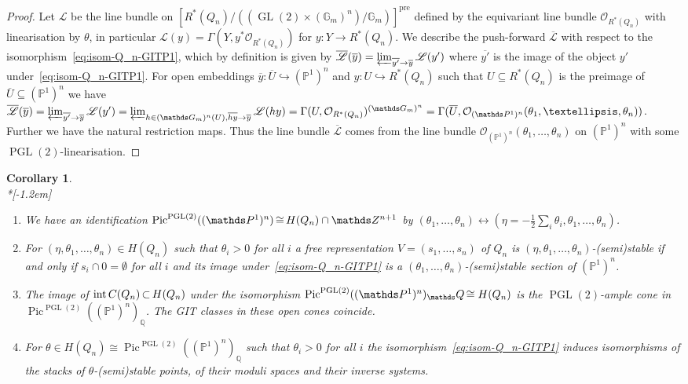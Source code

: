 \documentclass[10pt,a4paper]{amsart}
\newtheorem{coro}[theo]{Corollary}
\theoremstyle{definition}
\def\Z{\mathds Z}
\def\Q{\mathds Q}
\def\G{\mathds G}
\def\P{\mathds P}
\def\O{\mathcal O}
\DeclareMathOperator{\GL}{GL}
\DeclareMathOperator{\PGL}{PGL}
\DeclareMathOperator{\interior}{int}
\DeclareMathOperator{\Pic}{Pic}
\newcommand*{\Mk}{\mkern -2mu}
\begin{document}
\begin{proof}
Let $\mathscr L$ be the line bundle on 
$[R^*(Q_n)/((\GL(2)\times(\G_m)^n)/\G_m)]^\text{pre}$ defined by the 
equivariant line bundle $\O_{R^*(Q_n)}$ with linearisation by $\theta$, in 
particular $\mathscr L(y)=\Gamma(Y,y^*\O_{R^*(Q_n)})$ for $y\colon Y\to R^*(Q_n)$. 
We describe the push-forward $\overline{\mathscr L}$ with respect to the isomorphism~\eqref{eq:isom-Q_n-GITP1}, 
which by definition is given by 
$\overline{\mathscr L}(\overline{y})
=\varprojlim_{\overline{y'}\to\overline{y}}\mathscr L(y')$ where $\overline{y'}$ is the 
image of the object $y'$ under~\eqref{eq:isom-Q_n-GITP1}.
For open embeddings $\overline{y}\colon\overline{U}\hookrightarrow(\P^1)^n$ and 
$y\colon U\hookrightarrow R^*(Q_n)$ such that $U\subseteq R^*(Q_n)$ is the preimage of
$\overline{U}\subseteq(\P^1)^n$ we have
$\overline{\mathscr L}(\overline{y})
=\varprojlim_{\overline{y'}\to\overline{y}}\mathscr L(y')
=\varprojlim_{h\in(\G_m)^n(U),\overline{hy}\to\overline{y}}\mathscr L(hy)
=\Gamma(U,\O_{R^*(Q_n)})^{(\G_m)^n}
=\Gamma(\overline{U},\O_{(\P^1)^n}(\theta_1,\ldots,\theta_n))$.
Further we have the natural restriction maps. Thus the line bundle 
$\overline{\mathscr L}$ comes from the line bundle 
$\O_{(\P^1)^n}(\theta_1,\ldots,\theta_n)$ on $(\P^1)^n$ with some $\PGL(2)$-linearisation.
\end{proof}

\begin{coro}\ \\*[-1.2em]\label{cor:reprQn-P1n-GIT}

\begin{enumerate}[label=(\alph*)]
\item\label{coro2.10_a}
We have an identification
$\Pic^{\PGL(2)}((\P^1)^n)\Mk \cong \Mk H(Q_n)\cap\Z^{n+1}$ by 
$(\theta_1,\ldots,\theta_n)\leftrightarrow(\eta=-\frac{1}{2}\sum_i\theta_i,\theta_1,
\ldots,\theta_n)$.

\item\label{coro2.10_b}
For $(\eta,\theta_1,\ldots,\theta_n)\in H(Q_n)$ such that $\theta_i>0$ 
for all $i$ a free representation $V=(s_1,\ldots,s_n)$ of $Q_n$ is 
$(\eta,\theta_1,\ldots,\theta_n)$-(semi)stable if and only if 
$s_i\cap 0=\emptyset$ for all $i$ and its image under~\eqref{eq:isom-Q_n-GITP1} 
is a $(\theta_1,\ldots,\theta_n)$-(semi)stable 
section of $(\P^1)^n$.

\item\label{coro2.10_c}
The image of $\interior C(Q_n)\Mk \subset \Mk H(Q_n)$ under the isomorphism 
$\Pic^{\PGL(2)}((\P^1)^n)_\Q\Mk \cong H(Q_n)$ is the $\PGL(2)$-ample cone in 
$\Pic^{\PGL(2)}((\P^1)^n)_\Q$. The GIT classes in these open cones coincide.

\item\label{coro2.10_d}
For $\theta\in H(Q_n)\cong\Pic^{\PGL(2)}((\P^1)^n)_\Q$ such that 
$\theta_i>0$ for all $i$ the isomorphism~\eqref{eq:isom-Q_n-GITP1} induces 
isomorphisms of the stacks of $\theta$-(semi)stable points, of their moduli spaces 
and their inverse systems.
\end{enumerate}
\end{coro}
\end{document}
